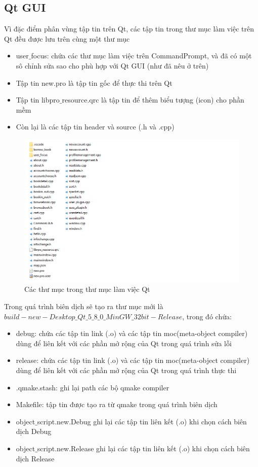 \documentclass[12pt,a4paper]{report}
\begin{document}
			\subsection{Qt GUI}
			Vì đặc điểm phân vùng tập tin trên Qt, các tập tin trong thư mục làm việc trên Qt đều được lưu trên cùng một thư mục
			\begin{itemize}
				\item user$\_$focus: chứa các thư mục làm việc trên CommandPrompt, và đã có một sô chỉnh sửa sao cho phù hợp với Qt GUI (như đã nêu ở trên)
				\item Tập tin new.pro là tập tin gốc để thực thi trên Qt
				\item Tập tin libpro$\_$resource.qrc là tập tin để thêm biểu tượng (icon) cho phần mềm
				\item Còn lại là các tập tin header và source (.h và .cpp)
			\end{itemize}
			\begin{figure}[H]
				\centering

				\label{F:qtfolder}
				\includegraphics[scale = 1]{qtfolder.png}
				\caption{Các thư mục trong thư mục làm việc Qt}
			\end{figure}
			Trong quá trình biên dịch sẽ tạo ra thư mục mới là \textbf{$build-new-Desktop\_Qt\_5\_8\_0\_MinGW\_32bit-Release$}, trong đó chứa:
			\begin{itemize}
				\item debug: chứa các tập tin link (.o) và các tập tin moc(meta-object compiler) dùng để liên kết với các phần mở rộng của Qt trong quá trình sửa lỗi
				\item release: chứa các tập tin link (.o) và các tập tin moc(meta-object compiler) dùng để liên kết với các phần mở rộng của Qt trong quá trình thực thi
				\item .qmake.stash: ghi lại path các bộ qmake compiler
				\item Makefile: tập tin được tạo ra từ qmake trong quá trình biên dịch
				\item object$\_$script.new.Debug ghi lại các tập tin liên kết (.o) khi chọn cách biên dịch Debug
				\item object$\_$script.new.Release ghi lại các tập tin liên kết (.o) khi chọn cách biên dịch Release
			\end{itemize}
\end{document}
